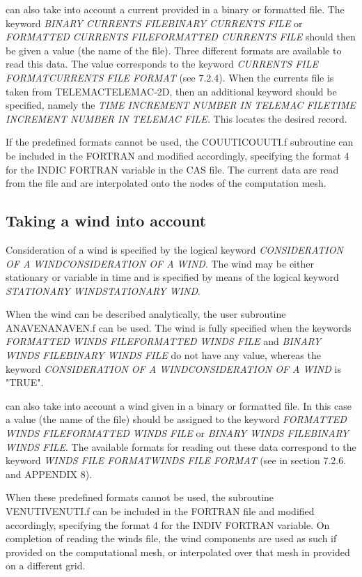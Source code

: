  \tomawac can also take into account a current provided in a binary or formatted file. The keyword \textit{BINARY CURRENTS FILEBINARY CURRENTS FILE }or\textit{ FORMATTED CURRENTS FILEFORMATTED CURRENTS FILE} should then be given a value (the name of the file). Three different formats are available to read this data. The value corresponds to the keyword \textit{CURRENTS FILE FORMATCURRENTS FILE FORMAT} (see 7.2.4). When the currents file is taken from TELEMACTELEMAC-2D, then an additional keyword should be specified, namely the \textit{TIME INCREMENT NUMBER IN TELEMAC FILETIME INCREMENT NUMBER IN TELEMAC FILE.} This locates the desired record.

 If the predefined formats cannot be used, the COUUTICOUUTI.f subroutine can be included in the FORTRAN and modified accordingly, specifying the format 4 for the INDIC FORTRAN variable in the CAS file. The current data are read from the file and are interpolated onto the nodes of the computation mesh.


\subsection{ Taking a wind into account}

 Consideration of a wind is specified by the logical keyword \textit{CONSIDERATION OF A WINDCONSIDERATION OF A WIND}. The wind may be either stationary or variable in time and is specified by means of the logical keyword \textit{STATIONARY WINDSTATIONARY WIND}.

 When the wind can be described analytically, the user subroutine ANAVENANAVEN.f can be used. The wind is fully specified when the keywords \textit{FORMATTED WINDS FILEFORMATTED WINDS FILE} and \textit{BINARY WINDS FILEBINARY WINDS FILE }do not have any value, whereas the keyword \textit{CONSIDERATION OF A WINDCONSIDERATION OF A WIND }is "TRUE".

 \tomawac can also take into account a wind given in a binary or formatted file. In this case a value (the name of the file) should be assigned to the keyword \textit{FORMATTED WINDS FILEFORMATTED WINDS FILE }or \textit{BINARY WINDS FILEBINARY WINDS FILE}. The available formats for reading out these data correspond to the keyword \textit{WINDS FILE FORMATWINDS FILE FORMAT} (see in section 7.2.6. and APPENDIX 8).

 When these predefined formats cannot be used, the subroutine VENUTIVENUTI.f can be included in the FORTRAN file and modified accordingly, specifying the format 4 for the INDIV FORTRAN variable. On completion of reading the winds file, the wind components are used as such if provided on the computational mesh, or interpolated over that mesh in provided on a different grid.

